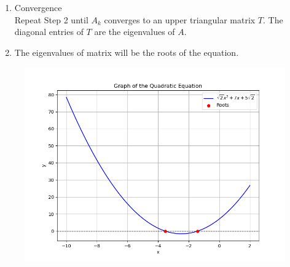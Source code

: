 \documentclass[journal]{IEEEtran}
\numberwithin{equation}{enumi}
\numberwithin{figure}{enumi}
\begin{document}
\begin{enumerate}
\begin{enumerate}
\item Convergence\\
Repeat Step 2 until $ A_k $ converges to an upper triangular matrix $ T $. The diagonal entries of $T$ are the eigenvalues of $A$.\\
\item The eigenvalues of matrix will be the roots of the equation.


\end{enumerate}


\begin{figure}[h!]
   \centering
   \includegraphics[width=0.7\linewidth]{figs/Figure_2.png}
\end{figure}
\end{enumerate}
\end{document}
